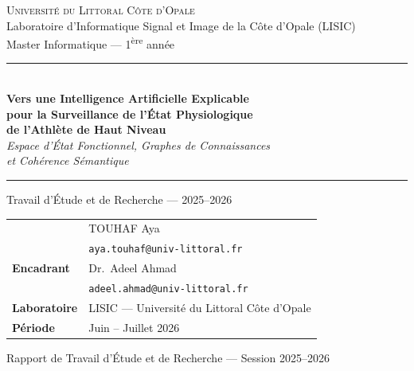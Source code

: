 \documentclass[12pt,a4paper]{article}
\begin{document}
\begin{titlepage}
\centering
\vspace*{1cm}

{\Large\textsc{Université du Littoral Côte d'Opale}}\\[0.3cm]
{\large Laboratoire d'Informatique Signal et Image de la Côte d'Opale (LISIC)}\\[0.2cm]
{\normalsize Master Informatique — 1\textsuperscript{ère} année}

\vspace{1.5cm}
\rule{\linewidth}{0.8pt}\\[0.4cm]
{\LARGE\bfseries Vers une Intelligence Artificielle Explicable\\[0.2cm]
pour la Surveillance de l'État Physiologique\\[0.2cm]
de l'Athlète de Haut Niveau}\\[0.3cm]
{\large\itshape Espace d'État Fonctionnel, Graphes de Connaissances\\
et Cohérence Sémantique}\\[0.2cm]
\rule{\linewidth}{0.8pt}

\vspace{1.2cm}
{\large Travail d'Étude et de Recherche — 2025--2026}

\vspace{1.5cm}
\begin{tabular}{ll}
\textbf & TOUHAF Aya \\[0.2cm]
                    & \texttt{aya.touhaf@univ-littoral.fr} \\[0.2cm]
\textbf{Encadrant}  & Dr.~Adeel Ahmad \\
                    & \texttt{adeel.ahmad@univ-littoral.fr} \\[0.2cm]
\textbf{Laboratoire} & LISIC — Université du Littoral Côte d'Opale \\[0.2cm]
\textbf{Période}    & Juin -- Juillet 2026 \\
\end{tabular}

\vfill
{\small Rapport de Travail d'Étude et de Recherche — Session 2025--2026}
\end{titlepage}
\end{document}
